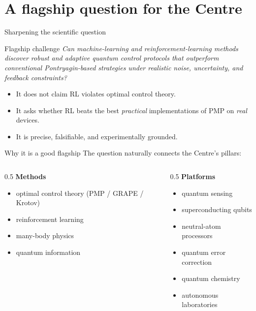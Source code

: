 \documentclass[10pt,aspectratio=169]{beamer}
\begin{document}
\section{A flagship question for the Centre}

\begin{frame}{Sharpening the scientific question}
  \begin{alertblock}{Flagship challenge}
    \emph{Can machine-learning and reinforcement-learning methods discover robust
    and adaptive quantum control protocols that outperform conventional
    Pontryagin-based strategies under realistic noise, uncertainty, and feedback
    constraints?}
  \end{alertblock}
  \vspace{0.5em}
  \begin{itemize}
    \item It does \alert{not} claim RL violates optimal control theory.
    \item It asks whether RL beats the best \emph{practical} implementations of
          PMP on \emph{real} devices.
    \item It is precise, falsifiable, and experimentally grounded.
  \end{itemize}
\end{frame}

\begin{frame}{Why it is a good flagship}
  The question naturally connects the Centre's pillars:
  \begin{columns}[T]
    \begin{column}{0.5\textwidth}
      \textbf{Methods}
      \begin{itemize}
        \item optimal control theory (PMP / GRAPE / Krotov)
        \item reinforcement learning
        \item many-body physics
        \item quantum information
      \end{itemize}
    \end{column}
    \begin{column}{0.5\textwidth}
      \textbf{Platforms}
      \begin{itemize}
        \item quantum sensing
        \item superconducting qubits
        \item neutral-atom processors
        \item quantum error correction
        \item quantum chemistry
        \item autonomous laboratories
      \end{itemize}
    \end{column}
  \end{columns}
\end{frame}
\end{document}
